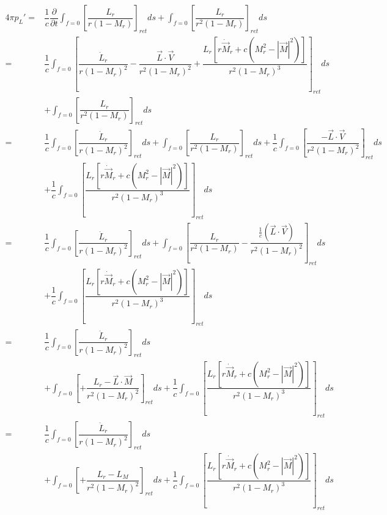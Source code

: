 \documentclass[onecolumn,10pt]{jhwhw}
\begin{document}
\begin{align*}
4\pi p_{L}' =& \dfrac{1}{c} \dfrac{\partial}{\partial t}
      \int_{f=0} \left[ \dfrac{L_r}{r   (1 - M_r)} \right]_{ret} ds
    + \int_{f=0} \left[ \dfrac{L_r}{r^2 (1 - M_r)} \right]_{ret} ds \\
=& \dfrac{1}{c} \int_{f=0} \left[
    \dfrac{\dot{L}_r}{r (1 - M_r)^2}
    - \dfrac{\vec{L}\cdot\vec{V}}{r^2 (1 - M_r)^2}
    + \dfrac{ L_r \left[
        r\dot{\vec{M}}_r + c \left( M_r^2 - |\vec{M}|^2 \right) \right] }
        {r^2 (1 - M_r)^3}
    \right]_{ret} ds \\
    &+ \int_{f=0} \left[ \dfrac{L_r}{r^2 (1 - M_r)} \right]_{ret} ds \\
=& \dfrac{1}{c} \int_{f=0} \left[
        \dfrac{\dot{L}_r}{r (1 - M_r)^2} \right]_{ret} ds + \int_{f=0} \left[ \dfrac{L_r}{r^2 (1 - M_r)} \right]_{ret} ds
    + \dfrac{1}{c} \int_{f=0} \left[
        \dfrac{-\vec{L}\cdot\vec{V}}{r^2 (1 - M_r)^2} \right]_{ret} ds \\
    &+ \dfrac{1}{c} \int_{f=0} \left[
        \dfrac{ L_r \left[
        r\dot{\vec{M}}_r + c \left( M_r^2 - |\vec{M}|^2 \right) \right] }
        {r^2 (1 - M_r)^3} \right]_{ret} ds \\
=& \dfrac{1}{c} \int_{f=0} \left[
        \dfrac{\dot{L}_r}{r (1 - M_r)^2} \right]_{ret} ds
    + \int_{f=0} \left[ \dfrac{L_r}{r^2 (1 - M_r)}
        - \dfrac{\frac{1}{c} (\vec{L}\cdot\vec{V})}{r^2 (1 - M_r)^2}
        \right]_{ret} ds \\
    &+ \dfrac{1}{c} \int_{f=0} \left[
        \dfrac{ L_r \left[
        r\dot{\vec{M}}_r + c \left( M_r^2 - |\vec{M}|^2 \right) \right] }
        {r^2 (1 - M_r)^3} \right]_{ret} ds \\
=& \dfrac{1}{c} \int_{f=0} \left[
        \dfrac{\dot{L}_r}{r (1 - M_r)^2} \right]_{ret} ds \\
    &+ \int_{f=0} \left[
        + \dfrac{L_r - \vec{L}\cdot\vec{M}}{r^2 (1 - M_r)^2}
        \right]_{ret} ds
    + \dfrac{1}{c} \int_{f=0} \left[
        \dfrac{ L_r \left[
        r\dot{\vec{M}}_r + c \left( M_r^2 - |\vec{M}|^2 \right) \right] }
        {r^2 (1 - M_r)^3} \right]_{ret} ds \\
=& \dfrac{1}{c} \int_{f=0} \left[
        \dfrac{\dot{L}_r}{r (1 - M_r)^2} \right]_{ret} ds \\
    &+ \int_{f=0} \left[
        + \dfrac{L_r - L_M}{r^2 (1 - M_r)^2}
        \right]_{ret} ds
    + \dfrac{1}{c} \int_{f=0} \left[
        \dfrac{ L_r \left[
        r\dot{\vec{M}}_r + c \left( M_r^2 - |\vec{M}|^2 \right) \right] }
        {r^2 (1 - M_r)^3} \right]_{ret} ds
\end{align*}
\end{document}
